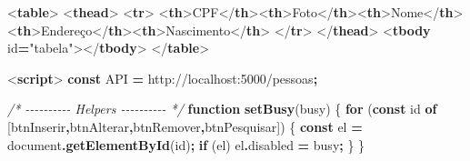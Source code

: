 \documentclass[
]{book}
\newenvironment{Shaded}{\begin{snugshade}}{\end{snugshade}}
\newcommand{\AttributeTok}[1]{\textcolor[rgb]{0.13,0.29,0.53}{#1}}
\newcommand{\BuiltInTok}[1]{#1}
\newcommand{\CommentTok}[1]{\textcolor[rgb]{0.56,0.35,0.01}{\textit{#1}}}
\newcommand{\ControlFlowTok}[1]{\textcolor[rgb]{0.13,0.29,0.53}{\textbf{#1}}}
\newcommand{\DataTypeTok}[1]{\textcolor[rgb]{0.13,0.29,0.53}{#1}}
\newcommand{\FunctionTok}[1]{\textcolor[rgb]{0.13,0.29,0.53}{\textbf{#1}}}
\newcommand{\KeywordTok}[1]{\textcolor[rgb]{0.13,0.29,0.53}{\textbf{#1}}}
\newcommand{\NormalTok}[1]{#1}
\newcommand{\OperatorTok}[1]{\textcolor[rgb]{0.81,0.36,0.00}{\textbf{#1}}}
\newcommand{\OtherTok}[1]{\textcolor[rgb]{0.56,0.35,0.01}{#1}}
\newcommand{\StringTok}[1]{\textcolor[rgb]{0.31,0.60,0.02}{#1}}
\begin{document}
\begin{Shaded}
\begin{Highlighting}[]
\DataTypeTok{\textless{}}\KeywordTok{table}\DataTypeTok{\textgreater{}}
  \DataTypeTok{\textless{}}\KeywordTok{thead}\DataTypeTok{\textgreater{}}
    \DataTypeTok{\textless{}}\KeywordTok{tr}\DataTypeTok{\textgreater{}}
      \DataTypeTok{\textless{}}\KeywordTok{th}\DataTypeTok{\textgreater{}}\NormalTok{CPF}\DataTypeTok{\textless{}/}\KeywordTok{th}\DataTypeTok{\textgreater{}\textless{}}\KeywordTok{th}\DataTypeTok{\textgreater{}}\NormalTok{Foto}\DataTypeTok{\textless{}/}\KeywordTok{th}\DataTypeTok{\textgreater{}\textless{}}\KeywordTok{th}\DataTypeTok{\textgreater{}}\NormalTok{Nome}\DataTypeTok{\textless{}/}\KeywordTok{th}\DataTypeTok{\textgreater{}}
      \DataTypeTok{\textless{}}\KeywordTok{th}\DataTypeTok{\textgreater{}}\NormalTok{Endereço}\DataTypeTok{\textless{}/}\KeywordTok{th}\DataTypeTok{\textgreater{}\textless{}}\KeywordTok{th}\DataTypeTok{\textgreater{}}\NormalTok{Nascimento}\DataTypeTok{\textless{}/}\KeywordTok{th}\DataTypeTok{\textgreater{}}
    \DataTypeTok{\textless{}/}\KeywordTok{tr}\DataTypeTok{\textgreater{}}
  \DataTypeTok{\textless{}/}\KeywordTok{thead}\DataTypeTok{\textgreater{}}
  \DataTypeTok{\textless{}}\KeywordTok{tbody}\OtherTok{ id}\OperatorTok{=}\StringTok{"tabela"}\DataTypeTok{\textgreater{}\textless{}/}\KeywordTok{tbody}\DataTypeTok{\textgreater{}}
\DataTypeTok{\textless{}/}\KeywordTok{table}\DataTypeTok{\textgreater{}}

\DataTypeTok{\textless{}}\KeywordTok{script}\DataTypeTok{\textgreater{}}
\KeywordTok{const}\NormalTok{ API }\OperatorTok{=} \StringTok{\textquotesingle{}http://localhost:5000/pessoas\textquotesingle{}}\OperatorTok{;}

\CommentTok{/* {-}{-}{-}{-}{-}{-}{-}{-}{-}{-} Helpers {-}{-}{-}{-}{-}{-}{-}{-}{-}{-} */}
\KeywordTok{function} \FunctionTok{setBusy}\NormalTok{(busy) \{}
  \ControlFlowTok{for}\NormalTok{ (}\KeywordTok{const}\NormalTok{ id }\KeywordTok{of}\NormalTok{ [}\StringTok{\textquotesingle{}btnInserir\textquotesingle{}}\OperatorTok{,}\StringTok{\textquotesingle{}btnAlterar\textquotesingle{}}\OperatorTok{,}\StringTok{\textquotesingle{}btnRemover\textquotesingle{}}\OperatorTok{,}\StringTok{\textquotesingle{}btnPesquisar\textquotesingle{}}\NormalTok{]) \{}
    \KeywordTok{const}\NormalTok{ el }\OperatorTok{=} \BuiltInTok{document}\OperatorTok{.}\FunctionTok{getElementById}\NormalTok{(id)}\OperatorTok{;}
    \ControlFlowTok{if}\NormalTok{ (el) el}\OperatorTok{.}\AttributeTok{disabled} \OperatorTok{=}\NormalTok{ busy}\OperatorTok{;}
\NormalTok{  \}}
\NormalTok{\}}


\end{Highlighting}
\end{Shaded}
\end{document}
